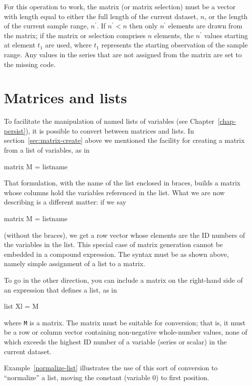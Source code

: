 For this operation to work, the matrix (or matrix selection) must be a
vector with length equal to either the full length of the current
dataset, $n$, or the length of the current sample range, $n^{\prime}$.
If $n^{\prime} < n$ then only $n^{\prime}$ elements are drawn from the
matrix; if the matrix or selection comprises $n$ elements, the
$n^{\prime}$ values starting at element $t_1$ are used, where $t_1$
represents the starting observation of the sample range.  Any values
in the series that are not assigned from the matrix are set to the
missing code.


\section{Matrices and lists}
\label{matrix-and-list}

To facilitate the manipulation of named lists of variables (see
Chapter~\ref{chap-persist}), it is possible to convert between
matrices and lists.  In section~\ref{sec:matrix-create} above we mentioned
the facility for creating a matrix from a list of variables, as in
%
\begin{code}
matrix M = { listname }
\end{code}
%
That formulation, with the name of the list enclosed in braces, builds
a matrix whose columns hold the variables referenced in the list.
What we are now describing is a different matter: if we say
%
\begin{code}
matrix M = listname
\end{code}
%
(without the braces), we get a row vector whose elements are
the ID numbers of the variables in the list.  This special case
of matrix generation cannot be embedded in a compound
expression.  The syntax must be as shown above, namely simple
assignment of a list to a matrix.

To go in the other direction, you can include a matrix on the
right-hand side of an expression that defines a list, as in
%
\begin{code}
list Xl = M
\end{code}
%
where \texttt{M} is a matrix.  The matrix must be suitable for
conversion; that is, it must be a row or column vector containing
non-negative whole-number values, none of which exceeds the highest ID
number of a variable (series or scalar) in the current dataset.

Example~\ref{normalize-list} illustrates the use of this sort of
conversion to ``normalize'' a list, moving the constant (variable 0)
to first position.

